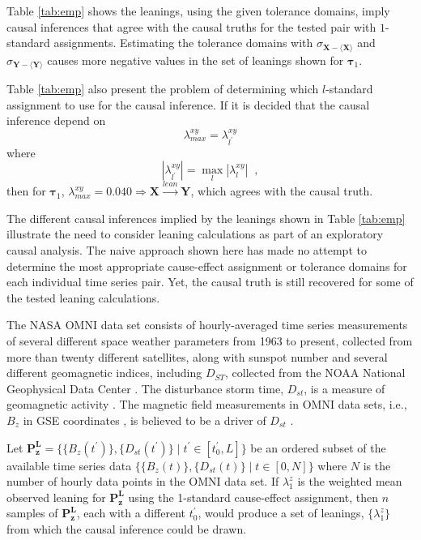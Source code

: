 \documentclass[a4paper,11pt,twocolumn]{article}
\begin{document}
Table \ref{tab:emp} shows the leanings, using the given tolerance domains, imply causal inferences that agree with the causal truths for the tested pair with $1$-standard assignments.  Estimating the tolerance domains with $\sigma_{\mathbf{X}-\langle\mathbf{X}\rangle}$ and $\sigma_{\mathbf{Y}-\langle\mathbf{Y}\rangle}$ causes more negative values in the set of leanings shown for $\mathbf{\tau}_1$.  

Table \ref{tab:emp} also present the problem of determining which $l$-standard assignment to use for the causal inference.  If it is decided that the causal inference depend on
\begin{equation}
\lambda^{xy}_{max} = \lambda^{xy}_{l^\prime}
\end{equation}
where
\begin{equation}
|\lambda^{xy}_{l^\prime}| = \max_l |\lambda^{xy}_l|\;\;,
\end{equation}
then for $\mathbf{\tau}_1$, $\lambda^{xy}_{max}=0.040\Rightarrow\mathbf{X}\xrightarrow{lean}\mathbf{Y}$, which agrees with the causal truth.

The different causal inferences implied by the leanings shown in Table \ref{tab:emp} illustrate the need to consider leaning calculations as part of an exploratory causal analysis.  The naive approach shown here has made no attempt to determine the most appropriate cause-effect assignment or tolerance domains for each individual time series pair.  Yet, the causal truth is still recovered for some of the tested leaning calculations. 

The NASA OMNI data set consists of hourly-averaged time series measurements of several different space weather parameters from 1963 to present, collected from more than twenty different satellites, along with sunspot number and several different geomagnetic indices, including $D_{ST}$, collected from the NOAA National Geophysical Data Center \cite{King2005}.  The disturbance storm time, $D_{st}$, is a measure of geomagnetic activity \cite{IAGA}.  The magnetic field measurements in OMNI data sets, i.e., $B_z$ in GSE coordinates \cite{Hapgood1992}, is believed to be a driver of $D_{st}$ \cite{spaceweathertextbook}.

Let $\mathbf{P_{z}^L}=\{\{B_z(t^\prime)\},\{D_{st}(t^\prime)\}\;|\;t^\prime\in[t^\prime_0,L]\}$ be an ordered subset of the available time series data $\{\{B_z(t)\},\{D_{st}(t)\}\;|\;t\in[0,N]\}$ where $N$ is the number of hourly data points in the OMNI data set.  If $\lambda_1^{z}$ is the weighted mean observed leaning for $\mathbf{P_{z}^L}$ using the 1-standard cause-effect assignment, then $n$ samples of $\mathbf{P_{z}^L}$, each with a different $t^\prime_0$,  would produce a set of leanings, $\{\lambda_1^{z}\}$ from which the causal inference could be drawn.
\end{document}
